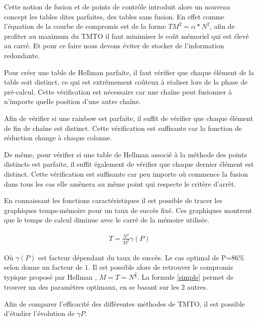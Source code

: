 	Cette notion de fusion et de points de contrôle introduit alors un nouveau concept les tables dites parfaites, des tables sans fusion. En effet comme l'équation de la courbe de compromis est de la forme $TM^2=\alpha *N^2$, afin de profiter au maximum du \gls{TMTO} il faut minimiser le coût mémoriel qui est élevé au carré. Et pour ce faire nous devons éviter de stocker de l'information redondante.

	\bigskip

	Pour créer une table de Hellman parfaite, il faut vérifier que chaque élément de la table soit distinct, ce qui est extrêmement coûteux à réaliser lors de la phase de pré-calcul. Cette vérification est nécessaire car une chaîne peut fusionner à n'importe quelle position d'une autre chaîne.

	\bigskip

	Afin de vérifier si une \gls{rainbow} est parfaite, il suffit de vérifier que chaque élément de fin de chaîne est distinct. Cette vérification est suffisante car la fonction de réduction change à chaque colonne.

	\bigskip

	De même, pour vérifier si une table de Hellman associé à la méthode des points distincts est parfaite, il suffit également de vérifier que chaque dernier élément est distinct. Cette vérification est suffisante car peu importe où commence la fusion dans tous les cas elle amènera au même point qui respecte le critère d'arrêt.


	En connaissant les fonctions caractéristiques il est possible de tracer les graphiques temps-mémoire pour un taux de succès fixé. Ces graphiques montrent que le temps de calcul diminue avec le carré de la mémoire utilisée.

	\begin{align}
		T=\frac{N^2}{M^2}\gamma(P) \label{simple} 
	\end{align}

	Où $\gamma(P)$ est facteur dépendant du taux de succès. Le cas optimal de P=86\% selon \cite{checkpoints} donne un facteur de $1$. Il est possible alors de retrouver le compromis typique proposé par Hellman \cite{ehellman}, $M=T=N^{\frac{2}{3}}$. La formule \ref{simple} permet de trouver un des paramètres optimaux, en se basant sur les 2 autres.

	\bigskip

	Afin de comparer l'efficacité des différentes méthodes de \gls{TMTO}, il est possible d'étudier l'évolution de $\gamma{P}$.

